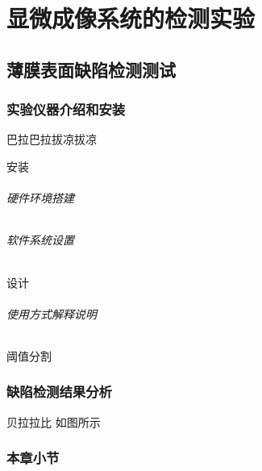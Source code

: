 \chapter{显微成像系统的检测实验}
\section{薄膜表面缺陷检测测试}
\subsection{实验仪器介绍和安装}
巴拉巴拉拔凉拔凉

安装

\subparagraph{硬件环境搭建}
\subparagraph{软件系统设置}

设计

\subparagraph{使用方式解释说明}

阈值分割
\subsection{缺陷检测结果分析}
贝拉拉比
如图所示

\subsection{本章小节}